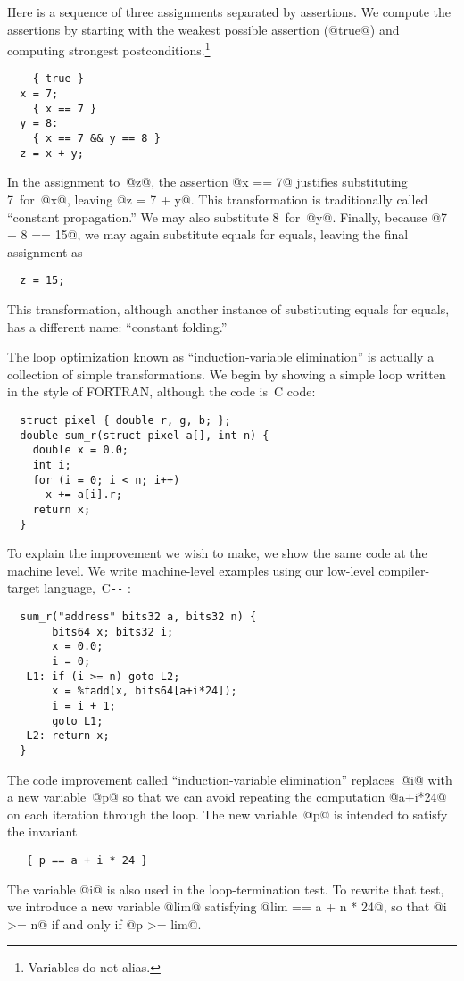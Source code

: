 \documentclass[blockstyle,preprint,nocopyrightspace]{sigplanconf}
\let\cite\citep
\newcommand\PAL{\mbox{C{\texttt{-{}-}}}}
\begin{document}
Here is a sequence of three assignments separated by assertions.
We compute the assertions by starting with the weakest possible
assertion (@true@) and computing strongest postconditions.\footnote
{Variables do not alias.}
\begin{verbatim}
    { true }
  x = 7;
    { x == 7 }
  y = 8: 
    { x == 7 && y == 8 }
  z = x + y;
\end{verbatim}
In the assignment to~@z@, the assertion @x == 7@ justifies
substituting 7~for~@x@, leaving @z = 7 + y@.  
This transformation is traditionally called ``constant propagation.''
We may also substitute 8~for~@y@.
Finally, because @7 + 8 == 15@, we may again substitute equals for
equals, leaving the final assignment as
\begin{verbatim}
  z = 15;
\end{verbatim}
This transformation, although another instance of substituting equals
for equals, has a different name: ``constant folding.''


The loop optimization known as ``induction-variable elimination'' is
actually a collection of simple transformations.
We begin by showing a simple loop written in the style of FORTRAN,
although the code is~C code:
\begin{verbatim}
  struct pixel { double r, g, b; };
  double sum_r(struct pixel a[], int n) {
    double x = 0.0;
    int i;
    for (i = 0; i < n; i++)
      x += a[i].r;
    return x;
  }
\end{verbatim}
To explain the improvement we wish to make, we show the same
code at the machine level.
We write machine-level examples using our low-level compiler-target
language,~{\PAL} %
\cite{peyton-jones-ramsey:garbage-collection,peyton-jones-ramsey:exceptions}: 
\begin{verbatim}
  sum_r("address" bits32 a, bits32 n) {
       bits64 x; bits32 i;
       x = 0.0;
       i = 0;
   L1: if (i >= n) goto L2;
       x = %fadd(x, bits64[a+i*24]);
       i = i + 1;
       goto L1;
   L2: return x; 
  }
\end{verbatim}
The code improvement called ``induction-variable elimination''
replaces~@i@ with a new variable~@p@ so that we can avoid repeating
the computation @a+i*24@ on each iteration through the loop.
The new variable~@p@ is intended to satisfy the invariant
\begin{verbatim}
   { p == a + i * 24 }
\end{verbatim}
The variable @i@ is also used in the loop-termination test.
To rewrite that test, 
we introduce a new variable @lim@ satisfying @lim == a + n * 24@,
so that @i >= n@ if and only if @p >= lim@.
\end{document}

